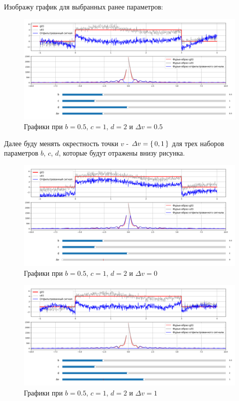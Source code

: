 \documentclass[a4paper,12pt]{article}
\begin{document}
Изображу график для выбранных ранее параметров:

\begin{figure}[H]  
    \centering
    \includegraphics[width=1\textwidth]{../images/1.4.1.png}
    \caption{Графики при \(b = 0.5\), \(c =  1\), \(d = 2\) и \(\varDelta  v = 0.5\)}  
    \label{fig:my_image}  
\end{figure}

Далее буду менять окрестность точки \(v\) - \(\varDelta v = \set{0, 1}\) для
трех наборов параметров \(b\), \(c\), \(d\), которые будут отражены внизу рисунка.


\begin{figure}[H]  
    \centering
    \includegraphics[width=1\textwidth]{../images/1.4.2.png}
    \caption{Графики при \(b = 0.5\), \(c =  1\), \(d = 2\) и \(\varDelta  v = 0\)}  
    \label{fig:my_image}  
\end{figure}


\begin{figure}[H]  
    \centering
    \includegraphics[width=1\textwidth]{../images/1.4.3.png}
    \caption{Графики при \(b = 0.5\), \(c =  1\), \(d = 2\) и \(\varDelta  v = 1\)}  
    \label{fig:my_image}  
\end{figure}
\end{document}
